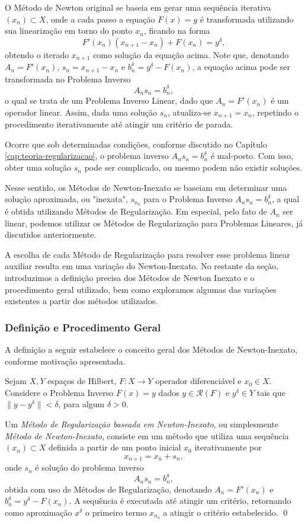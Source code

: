 O Método de Newton original se baseia em gerar uma sequência iterativa $(x_n) \subset X$, onde a cada passo a equação $F(x) = y$ é transformada utilizando sua linearização em torno do ponto $x_n$, ficando na forma
\[
    F'(x_n)(x_{n+1} - x_n) + F(x_n) = y^\delta,
\]
obtendo o iterado $x_{n+1}$ como solução da equação acima.  Note que, denotando $A_n = F'(x_n)$, $s_n = x_{n+1} - x_n$ e $b_n^\delta = y^\delta - F(x_n)$, a equação acima pode ser transformada no Problema Inverso
\[
A_n s_n = b_n^\delta,
\]
o qual se trata de um Problema Inverso Linear, dado que $A_n = F'(x_n)$ é um operador linear. Assim, dada uma solução $s_n$, atualiza-se $x_{n+1} = x_n$, repetindo o procedimento iterativamente até atingir um critério de parada.

Ocorre que sob determinadas condições, conforme discutido no Capítulo \ref{cap:teoria-regularizacao}, o problema inverso $A_n s_n = b_n^\delta$ é mal-posto. Com isso, obter uma solução $s_n$ pode ser complicado, ou mesmo podem não existir soluções. 

Nesse sentido, os Métodos de Newton-Inexato se baseiam em determinar uma solução aproximada, ou "inexata", $s_{n_\delta}$ para o Problema Inverso $A_n s_n = b_n^\delta$, a qual é obtida utilizando Métodos de Regularização. Em especial, pelo fato de $A_n$ ser linear, podemos utilizar os Métodos de Regularização para Problemas Lineares, já discutidos anteriormente. 

A escolha de cada Método de Regularização para resolver esse problema linear auxiliar resulta em uma variação do Newton-Inexato. No restante da seção, introduzimos a definição precisa dos Métodos de Newton Inexato e o procedimento geral utilizado, bem como exploramos algumas das variações existentes a partir dos métodos utilizados.

\subsubsection{Definição e Procedimento Geral}

A definição a seguir estabelece o conceito geral dos Métodos de Newton-Inexato, conforme motivação apresentada.

\begin{defin}\label{def:newton-inexato}
    Sejam $X,Y$ espaços de Hilbert, $F:X \to Y$ operador diferenciável e $x_0 \in X$. Considere o Problema Inverso $F(x)=y$ dados $y \in \mathcal R(F)$ e $y^\delta \in Y$ tais que $\| y-y^\delta\|< \delta$, para algum $\delta>0$. 

    Um \textit{Método de Regularização baseada em Newton-Inexato}, ou simplesmente \textit{Método de Newton-Inexato}, consiste em um método que utiliza uma sequência $(x_n)\subset X$ definida a partir de um ponto inicial $x_0$ iterativamente por
    \[
    x_{n+1} = x_n + s_n,
    \]
    onde $s_n$ é solução do problema inverso
    \[
        A_n s_n = b_n^\delta,
    \] 
    obtida com uso de Métodos de Regularização, denotando $A_n = F'(x_n)$ e $b^\delta_n = y^\delta - F(x_n)$. A sequência é executada até atingir um critério, retornando como aproximação $x^\delta$ o primeiro termo $x_{n_\delta}$ a atingir o critério estabelecido. \qed
\end{defin}

